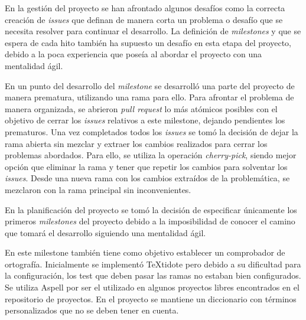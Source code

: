 En la gestión del proyecto se han afrontado algunos desafíos como la correcta creación de \emph{issues} que definan de manera corta un problema o desafío que se necesita resolver para continuar el desarrollo. La definición de \emph{milestones} y que se espera de cada hito también ha supuesto un desafío en esta etapa del proyecto, debido a la poca experiencia que poseía al abordar el proyecto con una mentalidad ágil.

En un punto del desarrollo del \emph{milestone} se desarrolló una parte del proyecto de manera prematura, utilizando una rama para ello. Para afrontar el problema de manera organizada, se abrieron \emph{pull request} lo más atómicos posibles con el objetivo de cerrar los \emph{issues} relativos a este milestone, dejando pendientes los prematuros. Una vez completados todos los \emph{issues} se tomó la decisión de dejar la rama abierta sin mezclar y extraer los cambios realizados para cerrar los problemas abordados. Para ello, se utiliza la operación \emph{cherry-pick}, siendo mejor opción que eliminar la rama y tener que repetir los cambios para solventar los \emph{issues}. Desde una nueva rama con los cambios extraídos de la problemática, se mezclaron con la rama principal sin inconvenientes.

En la planificación del proyecto se tomó la decisión de especificar únicamente los primeros \emph{milestones} del proyecto debido a la imposibilidad de conocer el camino que tomará el desarrollo siguiendo una mentalidad ágil. 

En este milestone también tiene como objetivo establecer un comprobador de ortografía. Inicialmente se implementó TeXtidote pero debido a su dificultad para la configuración, los test que deben pasar las ramas no estaban bien configurados. Se utiliza Aspell por ser el utilizado en algunos proyectos libres encontrados en el repositorio de proyectos. En el proyecto se mantiene un diccionario con términos personalizados que no se deben tener en cuenta. 